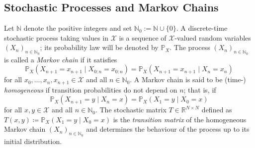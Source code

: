 \documentclass{svproc}
\newcommand{\X}{\mathcal{X}}
\newcommand{\N}{\mathbb{N}}
\newcommand{\R}{\mathbb{R}}
\newcommand{\PP}{\mathbb{P}}
\begin{document}
    \subsection{Stochastic Processes and Markov Chains}\label{sec:hmcs} 
    Let $\N$ denote the positive integers and set $\N_0 := \N\cup\{0\}$.
    A discrete-time stochastic process taking values in $\X$ is a sequence of $\X$-valued random variables $(X_n)_{n\in\N_0}$; its probability law will be denoted by $\PP_X$.
    The process $(X_n)_{n\in\N_0}$ is called a \textit{Markov chain} if it satisfies 
\begin{equation}\label{eq:markovprop}
    \PP_X(X_{n+1}=x_{n+1}\mid X_{0:n}=x_{0:n})=\PP_X(X_{n+1}=x_{n+1}\mid X_{n}=x_{n})
\end{equation}
for all $x_0, \dots, x_n,x_{n+1} \in \X$ and all $n\in\N_0$. 
A Markov chain is said to be (time-) \textit{homogeneous} if transition probabilities do not depend on $n$; that is, if
\begin{equation*}
   \PP_X(X_{n+1}=y\mid X_n=x)=\PP_X(X_1=y\mid X_0=x) 
\end{equation*}
for all $x,y\in \X$ and all $n\in \N_0$. 
The stochastic matrix $T\in \R^{N\times N}$ defined as $T(x,y)\coloneqq \PP_X(X_1=y\mid X_0=x)$ is the \textit{transition matrix} of the homogeneous Markov chain $(X_n)_{n\in\N_0}$ and determines the behaviour of the process up to its initial distribution. 
\end{document}
